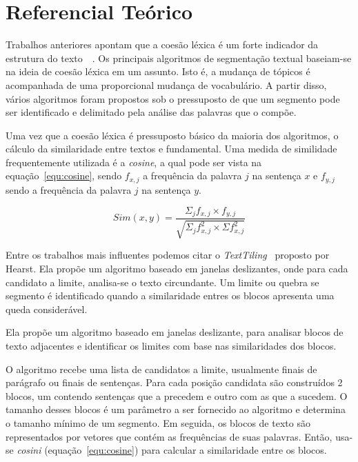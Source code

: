 \section{Referencial Teórico}
	\label{referencial}
	
Trabalhos anteriores apontam que a coesão léxica é um forte indicador da estrutura do texto~\cite{Galley2003}~\cite{Boguraev2000}.
Os principais algoritmos de segmentação textual baseiam-se na ideia de coesão léxica em um assunto. Isto é, a mudança de tópicos é acompanhada de uma proporcional mudança de vocabulário. A partir disso, vários algoritmos foram propostos sob o pressuposto de que um segmento pode ser identificado e delimitado pela análise das palavras que o compõe.

Uma vez que a coesão léxica é pressuposto básico da maioria dos algoritmos, o cálculo da similaridade entre textos e fundamental. Uma medida de similidade frequentemente utilizada é a \textit{cosine}, a qual pode ser vista na equação~\ref{equ:cosine}, sendo $f_{x,j}$ a frequência da palavra $j$ na sentença $x$ e $f_{y,j}$ sendo a frequência da palavra $j$ na sentença $y$.


\begin{equation}
Sim(x,y) = \frac
{\Sigma_j f_{x,j} \times f_{y,j}}
{\sqrt{\Sigma_j f^2_{x,j} \times \Sigma f^2_{x,j}}}
\label{equ:cosine}
\end{equation}



Entre os trabalhos mais influentes podemos citar o \textit{TextTiling}~\cite{Hearst1994} proposto por Hearst. Ela propõe um algoritmo baseado em janelas deslizantes, onde para cada candidato a limite, analisa-se o texto circundante. Um limite ou quebra se segmento é identificado quando a similaridade entres os blocos apresenta uma queda considerável.

Ela propõe um algoritmo baseado em janelas deslizante, para analisar blocos de texto adjacentes e identificar os limites com base nas similaridades dos blocos.

O algoritmo recebe uma lista de candidatos a limite, usualmente finais de parágrafo ou finais de sentenças. Para cada posição candidata são construídos 2 blocos, um contendo sentenças que a precedem e outro com as que a sucedem. O tamanho desses blocos é um parâmetro a ser fornecido ao algoritmo e determina o tamanho mínimo de um segmento.
%
Em seguida, os blocos de texto são representados por vetores que contém as frequências de suas palavras. Então, usa-se \textit{cosini} (equação~\ref{equ:cosine}) para calcular a similaridade entre os blocos.

